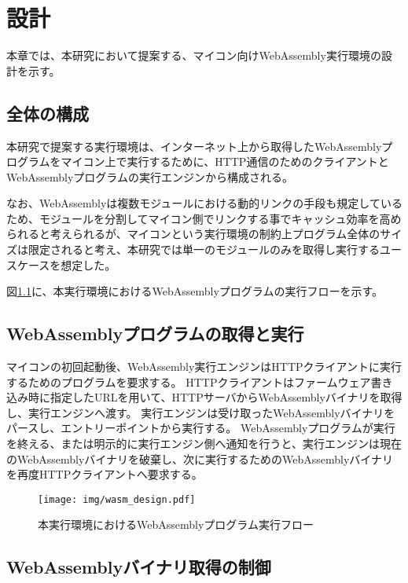 \chapter{設計}
\label{chap:design}

本章では、本研究において提案する、マイコン向けWebAssembly実行環境の設計を示す。

\section{全体の構成}

本研究で提案する実行環境は、インターネット上から取得したWebAssemblyプログラムをマイコン上で実行するために、HTTP通信のためのクライアントとWebAssemblyプログラムの実行エンジンから構成される。

なお、WebAssemblyは複数モジュールにおける動的リンクの手段も規定しているため、モジュールを分割してマイコン側でリンクする事でキャッシュ効率を高められると考えられるが、マイコンという実行環境の制約上プログラム全体のサイズは限定されると考え、本研究では単一のモジュールのみを取得し実行するユースケースを想定した。

図\ref{fig:wasm_design}に、本実行環境におけるWebAssemblyプログラムの実行フローを示す。

\section{WebAssemblyプログラムの取得と実行}

マイコンの初回起動後、WebAssembly実行エンジンはHTTPクライアントに実行するためのプログラムを要求する。
HTTPクライアントはファームウェア書き込み時に指定したURLを用いて、HTTPサーバからWebAssemblyバイナリを取得し、実行エンジンへ渡す。
実行エンジンは受け取ったWebAssemblyバイナリをパースし、エントリーポイントから実行する。
WebAssemblyプログラムが実行を終える、または明示的に実行エンジン側へ通知を行うと、実行エンジンは現在のWebAssemblyバイナリを破棄し、次に実行するためのWebAssemblyバイナリを再度HTTPクライアントへ要求する。

\begin{figure}[htbp]
  \caption{本実行環境におけるWebAssemblyプログラム実行フロー}
  \label{fig:wasm_design}
  \begin{center}
    \texttt{[image: img/wasm\_design.pdf]}
  \end{center}
\end{figure}

\section{WebAssemblyバイナリ取得の制御}

